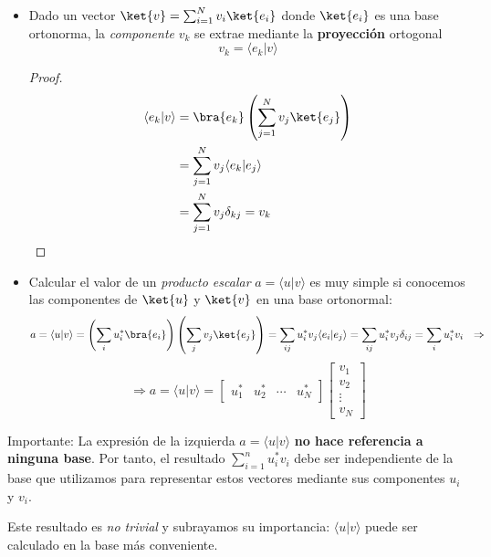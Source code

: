 \documentclass[a4paper,11pt]{book} %
\numberwithin{equation}{chapter}
\newcommand{\braket}[2]{\langle #1|#2\rangle}
\begin{document}
\begin{itemize}
	\item Dado un vector  $\ket{v} = \sum_{i=1}^N v_i \ket{e_i}$ donde $\ket{e_i}$ es una base ortonorma, la \textit{componente} $v_k$ se extrae mediante la \textbf{proyección} ortogonal
	\begin{equation}
	\boxed{v_k =\braket{e_k}{v}}
	\end{equation}

\begin{proof}
	\begin{align*}
\braket{e_k}{v} &=  \bra{e_k}\left(\sum_{j=1}^N v_j\ket{e_j}\right) \nonumber\\
                &=  \sum_{j=1}^N  v_j\braket{e_k}{e_j}  \nonumber\\
                &=  \sum_{j=1}^N  v_j\delta_{kj} = v_k
	\end{align*}
\end{proof}

	\item Calcular el valor de un \textit{producto escalar} $a=\braket{u}{v}$ es muy simple si conocemos las componentes de $\ket{u}$ y $\ket{v}$ en una base ortonormal:
	\begin{equation*}
	a = \braket{u}{v}
	 = \left(\sum_{i}u_i^*\bra{e_i}\right)\left(\sum_{j}v_j\ket{e_j} \right) 
	  = \sum_{ij} u_i^* v_j  \braket{e_i}{e_j}
	  = \sum_{ij} u_i^* v_j \delta_{ij} = \sum_{i} u_i^* v_i  ~~ \Rightarrow \\
	\end{equation*}
	\begin{equation}
	\Rightarrow \boxed{a =  \braket{u}{v} = \begin{bmatrix} {u_1^*} & {u_2^*} & \cdots & {u_N^*} 	\end{bmatrix}
	    \begin{bmatrix} {v_1}\\ {v_2}\\ \vdots \\ {v_N} \end{bmatrix}}
	\end{equation}
	
\end{itemize}

	\begin{mybox_blue}{Importante:}
	La expresión de la izquierda  $a = \braket{u}{v}$ \textbf{no hace referencia a ninguna base}. Por tanto, el resultado $\sum_{i=1}^n{ u_i^* v_i} $ debe ser independiente de la base que utilizamos para representar estos vectores mediante sus componentes $u_i$ y $v_i$. 
\vspace{0.3cm}    
    
Este resultado es \textit{no trivial} y subrayamos su importancia: $\braket{u}{v}$ puede ser calculado en la base más conveniente.
	\end{mybox_blue}
\end{document}

